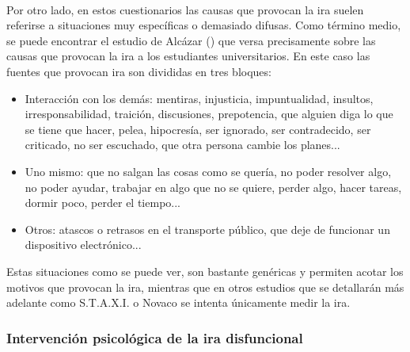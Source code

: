 \paragraph{}
Por otro lado, en estos cuestionarios las causas que provocan la ira suelen referirse a situaciones muy específicas o demasiado difusas. Como término medio, se puede encontrar el estudio de Alcázar (\citeyear{alcazar2015que}) que versa precisamente sobre las causas que provocan la ira a los estudiantes universitarios. En este caso las fuentes que provocan ira son divididas en tres bloques:
\begin{itemize}
\item Interacción con los demás: mentiras, injusticia, impuntualidad, insultos, irresponsabilidad, traición, discusiones, prepotencia, que alguien diga lo que se tiene que hacer, pelea, hipocresía, ser ignorado, ser contradecido, ser criticado, no ser escuchado, que otra persona cambie los planes...
\item Uno mismo: que no salgan las cosas como se quería, no poder resolver algo, no poder ayudar, trabajar en algo que no se quiere, perder algo, hacer tareas, dormir poco, perder el tiempo...
\item Otros: atascos o retrasos en el transporte público, que deje de funcionar un dispositivo electrónico...
\end{itemize}

Estas situaciones como se puede ver, son bastante genéricas y permiten acotar los motivos que provocan la ira, mientras que en otros estudios que se detallarán más adelante como S.T.A.X.I. o Novaco se intenta únicamente medir la ira.

\subsubsection{Intervención psicológica de la ira disfuncional}
\label{subsubsec:intervencionPsico}


